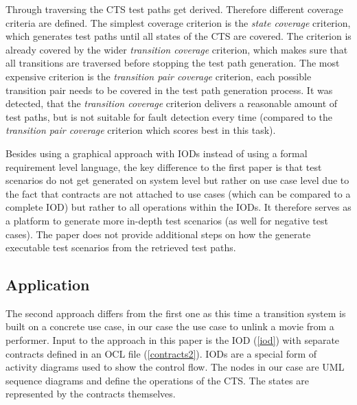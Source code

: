 Through traversing the CTS test paths get derived. Therefore different coverage criteria are defined. The simplest coverage criterion is the \textit{state coverage} criterion, which generates test paths until all states of the CTS are covered. The criterion is already covered by the wider \textit{transition coverage} criterion, which makes sure that all transitions are traversed before stopping the test path generation. The most expensive criterion is the \textit{transition pair coverage} criterion, each possible transition pair needs to be covered in the test path generation process. It was detected, that the \textit{transition coverage} criterion delivers a reasonable amount of test paths, but is not suitable for fault detection every time (compared to the \textit{transition pair coverage} criterion which scores best in this task). 

Besides using a graphical approach with IODs instead of using a formal requirement level language, the key difference to the first paper is that test scenarios do not get generated on system level but rather on use case level due to the fact that contracts are not attached to use cases (which can be compared to a complete IOD) but rather to all operations within the IODs. It therefore serves as a platform to generate more in-depth test scenarios (as well for negative test cases). The paper does not provide additional steps on how the generate executable test scenarios from the retrieved test paths. 

\subsection{Application}

The second approach differs from the first one as this time a transition system is built on a concrete use case, in our case the use case to unlink a movie from a performer. Input to the approach in this paper is the IOD (\autoref{iod}) with separate contracts defined in an OCL file (\autoref{contracts2}). IODs are a special form of activity diagrams used to show the control flow. The nodes in our case are UML sequence diagrams and define the operations of the CTS. The states are represented by the contracts themselves. 

